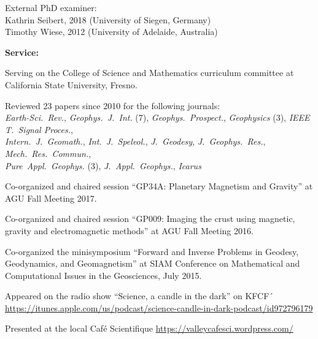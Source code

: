 \documentclass[10pt]{article}
\begin{document}
\spcp
External PhD examiner:\\
Kathrin Seibert, 2018 (University of Siegen, Germany)\\
Timothy Wiese, 2012 (University of Adelaide, Australia)



\spc
\textbf{\tsize Service:}

\spcp
Serving on the College of Science and Mathematics curriculum committee at\\
California State University, Fresno.

\spcp
Reviewed 23 papers since 2010 for the following journals:\\
\emph{Earth-Sci.~Rev.},
\emph{Geophys.~J.~Int.} (7),
\emph{Geophys.~Prospect.},
\emph{Geophysics} (3),
\emph{IEEE T.~Signal Proces.},\\
\emph{Intern.~J.~Geomath.},
\emph{Int.~J.~Speleol.},
\emph{J.~Geodesy},
\emph{J.~Geophys.~Res.},
\emph{Mech.~Res.~Commun.},\\
\emph{Pure~Appl.~Geophys.} (3),
\emph{J.~Appl.~Geophys.},
\emph{Icarus}


\spcp
Co-organized and chaired session
``GP34A: Planetary Magnetism and Gravity''
at AGU Fall Meeting 2017.
          
\spcp
Co-organized and chaired session
``GP009: Imaging the crust using magnetic, gravity and electromagnetic methods''
at AGU Fall Meeting 2016.

\spcp
Co-organized the minisymposium
``Forward and Inverse Problems in Geodesy, Geodynamics, and Geomagnetism''
at SIAM Conference on Mathematical and Computational Issues in the Geosciences, July 2015.

\spcp
Appeared on the radio show ``Science, a candle in the dark'' on KFCF´
\url{https://itunes.apple.com/us/podcast/science-candle-in-dark-podcast/id972796179}

\spcp
Presented at the local Caf\'e Scientifique
\url{https://valleycafesci.wordpress.com/}




%
\end{document}
